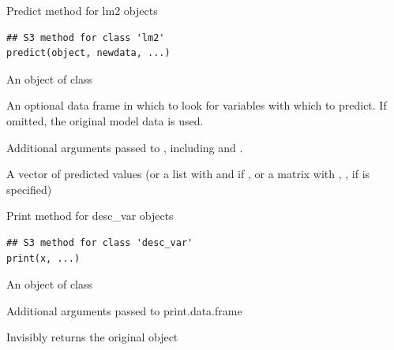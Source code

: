 \documentclass[a4paper]{book}
\begin{document}
%
\begin{Description}
Predict method for lm2 objects
\end{Description}
%
\begin{Usage}
\begin{verbatim}
## S3 method for class 'lm2'
predict(object, newdata, ...)
\end{verbatim}
\end{Usage}
%
\begin{Arguments}
\begin{ldescription}
\item[\code{object}] An object of class 

\item[\code{newdata}] An optional data frame in which to look for variables with 
which to predict. If omitted, the original model data is used.

\item[\code{...}] Additional arguments passed to ,
including  and .
\end{ldescription}
\end{Arguments}
%
\begin{Value}
A vector of predicted values (or a list with  and  
if , or a matrix with , ,  
if  is specified)
\end{Value}
%
\begin{Description}
Print method for desc\_var objects
\end{Description}
%
\begin{Usage}
\begin{verbatim}
## S3 method for class 'desc_var'
print(x, ...)
\end{verbatim}
\end{Usage}
%
\begin{Arguments}
\begin{ldescription}
\item[\code{x}] An object of class 

\item[\code{...}] Additional arguments passed to print.data.frame
\end{ldescription}
\end{Arguments}
%
\begin{Value}
Invisibly returns the original object
\end{Value}
\end{document}
